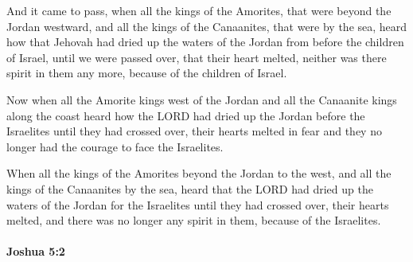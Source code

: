 			\begin{versebox}
					\item[BHS] 
					\item[ASV] And it came to pass, when all the kings of the Amorites, that were beyond the Jordan westward, and all the kings of the Canaanites, that were by the sea, heard how that Jehovah had dried up the waters of the Jordan from before the children of Israel, until we were passed over, that their heart melted, neither was there spirit in them any more, because of the children of Israel.
					\item[NIV] Now when all the Amorite kings west of the Jordan and all the Canaanite kings along the coast heard how the LORD had dried up the Jordan before the Israelites until they had crossed over, their hearts melted in fear and they no longer had the courage to face the Israelites.
					\item[NRSV] When all the kings of the Amorites beyond the Jordan to the west, and all the kings of the Canaanites by the sea, heard that the LORD had dried up the waters of the Jordan for the Israelites until they had crossed over, their hearts melted, and there was no longer any spirit in them, because of the Israelites.
			\end{versebox}

		\paragraph{Joshua 5:2} %
			\label{JOSHUA-5-2}

